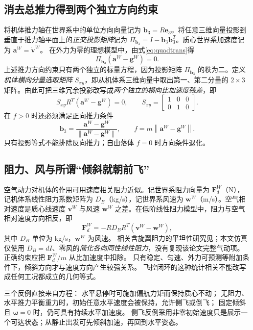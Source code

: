 \documentclass[UTF8,a4paper,fontset=fandol,11pt]{ctexart}
\newcommand{\norm}[1]{\left\lVert#1\right\rVert}
\newcommand{\e}{\bm e}
\newcommand{\vct}[1]{\bm #1}
\begin{document}
\subsection{消去总推力得到两个独立方向约束}
将机体推力轴在世界系中的单位方向向量记为 $\vct b_3=R\e_3$。将任意三维向量投影到垂直于推力轴平面上的\emph{正交投影矩阵}记为 $\Pi_{\vct b_3}=I-\vct b_3\vct b_3^T$。质心世界系加速度记为 $\vct a^W=\dot{\vct v}^W$。
在外力为零的理想模型中，由式\eqref{eq:quadtrans}得
\begin{equation}\label{eq:thrust}
 \boxed{\Pi_{\vct b_3}(\vct a^W-\vct g^W)=0}.
\end{equation}
上述推力方向约束只有两个独立的标量方程，因为投影矩阵 $\Pi_{\vct b_3}$ 的秩为二。定义\emph{机体横向分量选取矩阵} $S_{xy}$，即从机体系三维向量中取出第一、第二分量的 $2\times3$ 矩阵。由此可把三维冗余投影改写成\emph{两个独立的横向比加速度残差}，即
\begin{equation}
 S_{xy}R^T(\vct a^W-\vct g^W)=0,\qquad
 S_{xy}=\begin{bmatrix}1&0&0\\0&1&0\end{bmatrix}.
\end{equation}
在 $f>0$ 时还必须满足正向推力条件
\begin{equation}
 \vct b_3=\frac{\vct a^W-\vct g^W}{\norm{\vct a^W-\vct g^W}},\qquad
 f=m\norm{\vct a^W-\vct g^W}.
\end{equation}
只有投影等式不能排除反向推力；自由落体 $f=0$ 时方向条件退化。

\subsection{阻力、风与所谓“倾斜就朝前飞”}
空气动力对机体的作用可用速度相关阻力近似。记世界系阻力向量为 $\vct F_d^W$（N），记机体系线性阻力系数矩阵为 $D_B$（kg/s），记世界系风速为 $\vct w^W$（m/s）。空气相对速度是质心线速度 $\vct v^W$ 与风速 $\vct w^W$ 之差。在低阶线性阻力模型中，阻力与空气相对速度方向相反，即
\begin{equation}
 \vct F_d^W=-R D_B R^T(\vct v^W-\vct w^W),
\end{equation}
其中 $D_B$ 单位为 kg/s，$\vct w^W$ 为风速。
相关含旋翼阻力的平坦性研究见\cite{faessler}；本文仿真仅使用
$D_B=dI$、零风的\emph{简化各向同性线性阻力}，没有复现该论文完整气动项。
正确约束应把 $\vct F_d^W/m$ 从比加速度中扣除。
只有稳定、匀速、外力可预测等附加条件下，倾斜方向才与速度方向产生较强关系。
飞控闭环的这种统计相关不能改写成任何工况都成立的几何等式。

三个反例直接来自方程：
水平悬停时可施加偏航力矩而保持质心不动；
无阻力、水平推力平衡重力时，初始任意水平速度会被保持，允许侧飞或倒飞；
固定倾斜且 $\vct\omega=0$ 时，仍可具有持续水平加速度。
侧飞反例采用非零初始速度只是展示一个可达状态；从静止出发可先倾斜加速，再回到水平姿态。
\end{document}
